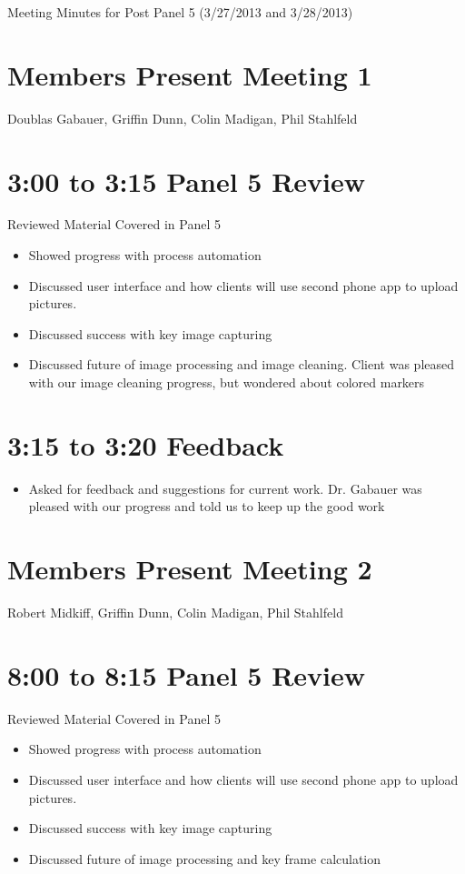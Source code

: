 \documentclass[]{article}
\begin{document}
	Meeting Minutes for Post Panel 5 (3/27/2013 and 3/28/2013)
	
	\section*{Members Present Meeting 1}
		Doublas Gabauer, Griffin Dunn, Colin Madigan, Phil Stahlfeld
	\section*{3:00 to 3:15 Panel 5 Review}
		\noindent Reviewed Material Covered in Panel 5
		\begin{itemize}
				\item Showed progress with process automation
				\item Discussed user interface and how clients will use second phone app to upload pictures.
				\item Discussed success with key image capturing
				\item Discussed future of image processing and image cleaning.
					\subitem Client was pleased with our image cleaning progress, but wondered about colored markers
		\end{itemize}
	
	\section*{3:15 to 3:20 Feedback}
		\begin{itemize}
			\item Asked for feedback and suggestions for current work.
				\subitem Dr. Gabauer was pleased with our progress and told us to keep up the good work
		\end{itemize}
				
	\section*{Members Present Meeting 2}
		Robert Midkiff, Griffin Dunn, Colin Madigan, Phil Stahlfeld
	\section*{8:00 to 8:15 Panel 5 Review}
		\noindent Reviewed Material Covered in Panel 5
		\begin{itemize}
				\item Showed progress with process automation
				\item Discussed user interface and how clients will use second phone app to upload pictures.
				\item Discussed success with key image capturing
				\item Discussed future of image processing and key frame calculation
		\end{itemize}
\end{document}
